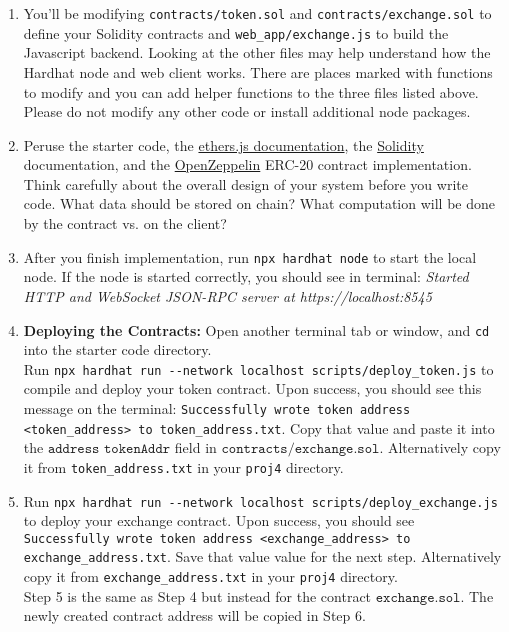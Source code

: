 \documentclass[11pt]{article}
\begin{document}
\begin{enumerate}
    \item You'll be modifying \verb|contracts/token.sol| and \verb|contracts/exchange.sol| to define your Solidity contracts and \verb|web_app/exchange.js| to build the Javascript backend. Looking at the other files may help understand how the Hardhat node and web client works. There are places marked with functions to modify and you can add helper functions to the three files listed above. Please do not modify any other code or install additional node packages.
    \item Peruse the starter code, the \hyperlink{https://docs.ethers.io/v5/}{ethers.js documentation}, the \hyperlink{https://docs.soliditylang.org/en/v0.8.17/}{Solidity} documentation, and the \hyperlink{https://docs.openzeppelin.com/contracts/4.x/erc20}{OpenZeppelin} ERC-20 contract implementation. Think carefully about the overall design of your system before you write code. What data should be stored on chain? What computation will be done by the contract vs. on the client?
    \item After you finish implementation, run \verb|npx hardhat node| to start the local node. If the node is started correctly, you should see in terminal: \textit{Started HTTP and WebSocket JSON-RPC server at https://localhost:8545}
    \item \textbf{Deploying the Contracts:} Open another terminal tab or window, and \verb|cd| into the starter code directory. \\Run \verb|npx hardhat run --network localhost scripts/deploy_token.js| to compile and deploy your token contract. Upon success, you should see this message on the terminal: \texttt{Successfully wrote token address <token\_address> to token\_address.txt}. Copy that value and paste it into the ${\texttt{address tokenAddr}}$ field in ${\texttt{contracts/exchange.sol}}$. Alternatively copy it from \texttt{token\_address.txt} in your \texttt{proj4} directory.
 
    \item Run \verb|npx hardhat run --network localhost scripts/deploy_exchange.js| to deploy your exchange contract. Upon success, you should see \texttt{Successfully wrote token address <exchange\_address> to exchange\_address.txt}. Save that value value for the next step. Alternatively copy it from \texttt{exchange\_address.txt} in your \texttt{proj4} directory. \\
    Step 5 is the same as Step 4 but instead for the contract ${\texttt{exchange.sol}}$. The newly created contract address will be copied in Step 6.
    

\end{enumerate}
\end{document}
